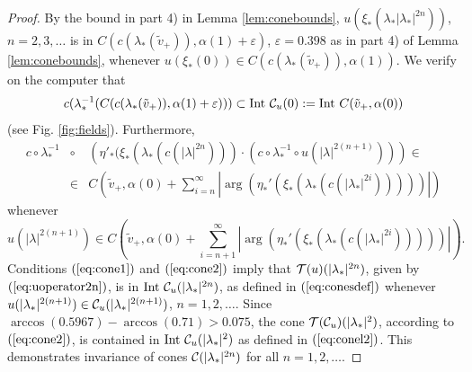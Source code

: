 \begin{proof}
By the bound in part 4) in Lemma \ref{lem:conebounds},  $u(\xi_*(\lambda_*|\lambda_*|^{2n}))$, $n=2,3, \ldots$ is in $C(c(\lambda_*(\tilde{v}_+)) , \alpha(1)+\varepsilon)$, $\varepsilon=0.398$ as in part 4) of Lemma \ref{lem:conebounds}, whenever $u(\xi_*(0)) \in C(c(\lambda_*(\tilde{v}_+)),\alpha(1))$. We verify on the computer that 
\begin{equation}\label{eq:cone1}
c(\lambda_*^{-1}(C(c(\lambda_*(\tilde{v}_+)),\alpha(1)+\varepsilon))) \subset {\rm Int} \ \cC_u(0):= {\rm Int} \ C(\tilde{v}_+,\alpha(0))
\end{equation}
(see Fig. \ref{fig:fields}). Furthermore,
\begin{eqnarray}
\nonumber  c \circ \lambda_*^{-1} \! \! & \! \! \circ  \!  \! & \! \! \left( \eta'_*(\xi_*(\lambda_*(c(|\lambda|^{2n}) )) \cdot (c \circ \lambda_*^{-1} \circ  u (|\lambda|^{2(n+1)})) \right) \in \\ 
\label{eq:cone2}  \! \! &\! \! \in \! \! & \! \! C(\tilde{v}_+,\alpha(0)+\sum_{i=n}^\infty |\arg(\eta_*'(\xi_*(\lambda_*(c(|\lambda_*|^{2i} )))))|)
\end{eqnarray}
whenever  
$$u (|\lambda|^{2(n+1)}) \in C(\tilde{v}_+,\alpha(0)+\sum_{i=n+1}^\infty |\arg(\eta_*'(\xi_*(\lambda_*(c(|\lambda_*|^{2i} )))))|).$$
Conditions $(\ref{eq:cone1})$ and $(\ref{eq:cone2})$ imply that $\mathcal{T}(u)(|\lambda_*|^{2 n})$, given by $(\ref{eq:uoperator2n})$,  is in ${\rm Int} \ \mathcal{C}_u(|\lambda_*|^{2 n})$, as defined in $(\ref{eq:conesdef})$ whenever $u(|\lambda_*|^{2 (n+1)}) \in \mathcal{C}_u(|\lambda_*|^{2 (n+1)})$, $n=1,2, \ldots$. Since $\arccos(0.5967) - \arccos(0.71)>0.075$, the cone  $\mathcal{T}(\mathcal{C}_u)(|\lambda_*|^{2})$, according to $(\ref{eq:cone2})$, is contained in ${\rm Int} \ \cC_u(|\lambda_*|^2)$ as defined in $(\ref{eq:conel2})$. This demonstrates invariance of cones $\mathcal{C}(|\lambda_*|^{2 n})$ for all $n=1,2, \ldots$.

\medskip


\end{proof}
